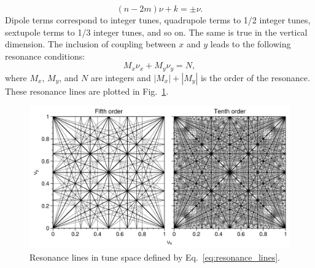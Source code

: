 %
\begin{equation}
    (n - 2m)\nu + k = \pm \nu.
\end{equation}
%
Dipole terms correspond to integer tunes, quadrupole terms to 1/2 integer tunes, sextupole terms to 1/3 integer tunes, and so on. The same is true in the vertical dimension. The inclusion of coupling between $x$ and $y$ leads to the following resonance conditions:
%
\begin{equation}\label{eq:resonance_lines}
    M_x \nu_x + M_y \nu_y = N,
\end{equation}
%
where $M_x$, $M_y$, and $N$ are integers and $|M_x| + |M_y|$ is the order of the resonance. These resonance lines are plotted in Fig.~\ref{fig:resonance_lines}.
%
\begin{figure}[!p]
    \centering
    \includegraphics[width=\textwidth]{Images/chapter1/resonance_lines.png}
    \caption{Resonance lines in tune space defined by Eq.~\eqref{eq:resonance_lines}.}
    \label{fig:resonance_lines}
\end{figure}
%
